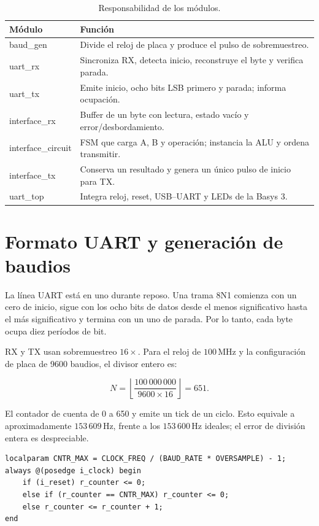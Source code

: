 \documentclass[11pt,a4paper]{article}
\newcommand{\verilog}[1]{\texttt{\detokenize{#1}}}
\begin{document}
\begin{table}[ht]
\centering
\caption{Responsabilidad de los módulos.}
\label{tab:modules}
\renewcommand{\arraystretch}{1.12}
\begin{tabular}{>{\ttfamily}l p{9.2cm}}
\toprule
\normalfont\textbf{Módulo} & \textbf{Función}\\
\midrule
baud\_gen & Divide el reloj de placa y produce el pulso de sobremuestreo.\\
uart\_rx & Sincroniza RX, detecta inicio, reconstruye el byte y verifica parada.\\
uart\_tx & Emite inicio, ocho bits LSB primero y parada; informa ocupación.\\
interface\_rx & Buffer de un byte con lectura, estado vacío y error/desbordamiento.\\
interface\_circuit & FSM que carga A, B y operación; instancia la ALU y ordena transmitir.\\
interface\_tx & Conserva un resultado y genera un único pulso de inicio para TX.\\
uart\_top & Integra reloj, reset, USB--UART y LEDs de la Basys 3.\\
\bottomrule
\end{tabular}
\end{table}

\section{Formato UART y generación de baudios}

La línea UART está en uno durante reposo. Una trama 8N1 comienza con un cero de inicio, sigue con los ocho bits de datos desde el menos significativo hasta el más significativo y termina con un uno de parada. Por lo tanto, cada byte ocupa diez períodos de bit.

RX y TX usan sobremuestreo $16\times$. Para el reloj de $100\,\mathrm{MHz}$ y la configuración de placa de 9600 baudios, el divisor entero es:

\begin{equation}
N=\left\lfloor\frac{100\,000\,000}{9600\times16}\right\rfloor=651.
\end{equation}

El contador de \verilog{baud_gen} cuenta de 0 a 650 y emite un tick de un ciclo. Esto equivale a aproximadamente $153\,609\,\mathrm{Hz}$, frente a los $153\,600\,\mathrm{Hz}$ ideales; el error de división entera es despreciable.

\begin{lstlisting}[caption={Contador del generador de tick},label={lst:baud}]
localparam CNTR_MAX = CLOCK_FREQ / (BAUD_RATE * OVERSAMPLE) - 1;
always @(posedge i_clock) begin
    if (i_reset) r_counter <= 0;
    else if (r_counter == CNTR_MAX) r_counter <= 0;
    else r_counter <= r_counter + 1;
end
\end{lstlisting}
\end{document}
